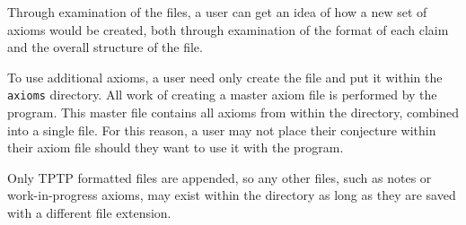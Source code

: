 Through examination of the files, a user can get an idea of how a new set of axioms would be created, both through examination of the format of each claim and the overall structure of the file.

To use additional axioms, a user need only create the file and put it within the \texttt{axioms} directory. All work of creating a master axiom file is performed by the program. This master file contains all axioms from within the directory, combined into a single file. For this reason, a user may not place their conjecture within their axiom file should they want to use it with the program.

Only TPTP formatted files are appended, so any other files, such as notes or work-in-progress axioms, may exist within the directory as long as they are saved with a different file extension.
